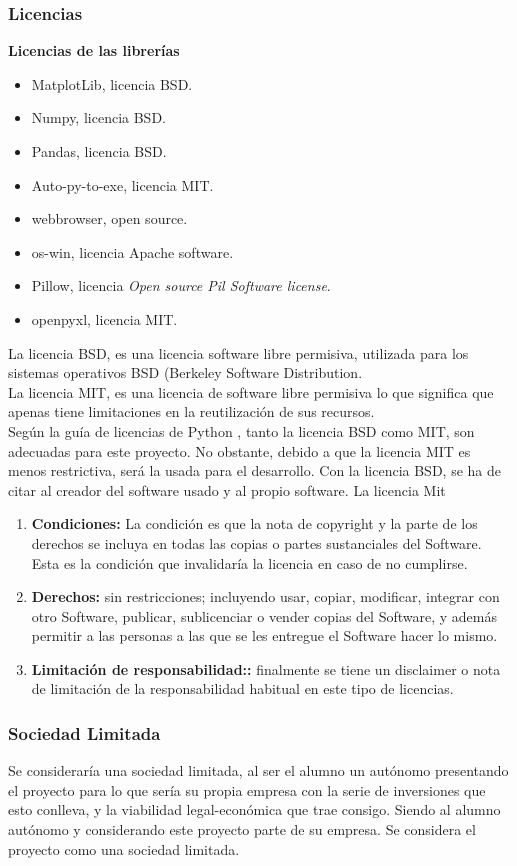 \subsubsection{Licencias}
\textbf{Licencias de las librerías}\\
\begin{itemize}
\item MatplotLib, licencia BSD.
\item Numpy, licencia BSD.
\item Pandas, licencia BSD.
\item Auto-py-to-exe, licencia MIT.
\item webbrowser, open source.
\item os-win, licencia Apache software.
\item Pillow, licencia \textit{Open source Pil Software license}.
\item openpyxl, licencia MIT. 
\end{itemize}
La licencia BSD, es una licencia software libre permisiva, utilizada para los sistemas operativos BSD (Berkeley Software Distribution.\\
La licencia MIT, es una licencia de software libre permisiva lo que significa que apenas tiene limitaciones en la reutilización de sus recursos.\\
Según la guía de licencias de Python \cite{licencias}, tanto la licencia BSD como MIT, son adecuadas para este proyecto. No obstante, debido a que la licencia MIT es menos restrictiva, será la usada para el desarrollo. Con la licencia BSD, se ha de citar al creador del software usado y al propio software.
La licencia Mit \cite{mit}
\begin{enumerate}
\item \textbf{Condiciones:}  La condición es que la nota de copyright y la parte de los derechos se incluya en todas las copias o partes sustanciales del Software. Esta es la condición que invalidaría la licencia en caso de no cumplirse.
\item \textbf{Derechos:}  sin restricciones; incluyendo usar, copiar, modificar, integrar con otro Software, publicar, sublicenciar o vender copias del Software, y además permitir a las personas a las que se les entregue el Software hacer lo mismo.
\item \textbf{Limitación de responsabilidad::}  finalmente se tiene un disclaimer o nota de limitación de la responsabilidad habitual en este tipo de licencias.
\end{enumerate}
\subsubsection{Sociedad Limitada}
Se consideraría una sociedad limitada, al ser el alumno un autónomo presentando el proyecto para lo que sería su propia empresa con la serie de inversiones que esto conlleva, y la viabilidad legal-económica que trae consigo.
Siendo al alumno autónomo y considerando este proyecto parte de su empresa. Se considera el proyecto como una sociedad limitada.\\

